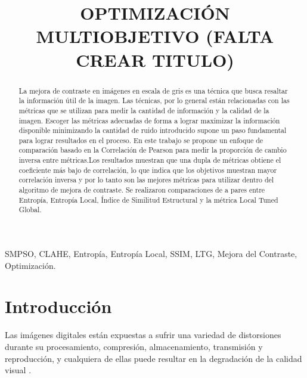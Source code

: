 \documentclass[spanish,twocolumn]{article}
\title{OPTIMIZACIÓN MULTIOBJETIVO (FALTA CREAR TITULO) }
\begin{document}
%	
\maketitle
%
\begin{abstract}


La mejora de contraste en imágenes en escala de gris es una técnica que busca resaltar la información útil de la imagen. Las técnicas, por lo general están relacionadas con las métricas que se utilizan para medir la cantidad de información y la calidad de la imagen. Escoger las métricas adecuadas de forma a lograr maximizar la información disponible minimizando la cantidad de ruido introducido supone un paso fundamental para lograr resultados en el proceso. En este trabajo se propone un enfoque de comparación basado en la Correlación de Pearson para medir la proporción de cambio inversa entre métricas.Los resultados muestran que una dupla de métricas obtiene el coeficiente más bajo de correlación, lo que indica que los objetivos muestran mayor correlación inversa y por lo tanto son las mejores métricas para utilizar dentro del algoritmo de mejora de contraste. Se realizaron comparaciones de a pares entre Entropía, Entropía Local, Índice de Similitud Estructural y la métrica Local Tuned Global.


\end{abstract}
%
\begin{keywords}
SMPSO, CLAHE, Entropía, Entropía Local, SSIM, LTG, Mejora del Contraste, Optimización.
\end{keywords}
%
\section{Introducción}
\label{sec:intro}
Las imágenes digitales están expuestas a sufrir una variedad de distorsiones durante su procesamiento, compresión, almacenamiento, transmisión y reproducción, y cualquiera de ellas puede resultar en la degradación de la calidad visual \cite{digitalimganalysis}.
\end{document}
